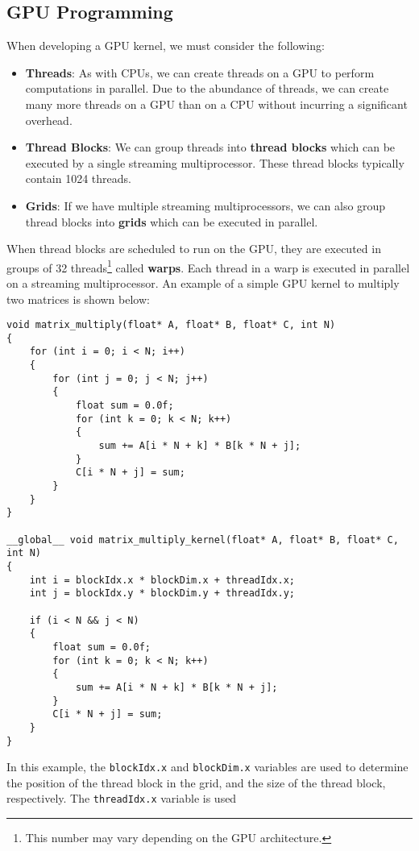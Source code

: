 \documentclass{article}
\begin{document}
\subsection{GPU Programming}
When developing a GPU kernel, we must consider the following:
\begin{itemize}
    \item \textbf{Threads}: As with CPUs, we can create threads on a GPU
          to perform computations in parallel. Due to the abundance of
          threads, we can create many more threads on a GPU than on a CPU
          without incurring a significant overhead.
    \item \textbf{Thread Blocks}: We can group threads into \textbf{thread
              blocks} which can be executed by a single streaming multiprocessor.
          These thread blocks typically contain 1024 threads.
    \item \textbf{Grids}: If we have multiple streaming multiprocessors, we
          can also group thread blocks into \textbf{grids} which can be
          executed in parallel.
\end{itemize}
When thread blocks are scheduled to run on the GPU, they are executed in
groups of 32 threads\footnote{
    This number may vary depending on the GPU architecture.
} called \textbf{warps}. Each thread in a warp is executed in parallel
on a streaming multiprocessor. An example of a simple GPU kernel to
multiply two matrices is shown below:
\begin{verbatim}
void matrix_multiply(float* A, float* B, float* C, int N)
{
    for (int i = 0; i < N; i++)
    {
        for (int j = 0; j < N; j++)
        {
            float sum = 0.0f;
            for (int k = 0; k < N; k++)
            {
                sum += A[i * N + k] * B[k * N + j];
            }
            C[i * N + j] = sum;
        }
    }
}

__global__ void matrix_multiply_kernel(float* A, float* B, float* C, int N)
{
    int i = blockIdx.x * blockDim.x + threadIdx.x;
    int j = blockIdx.y * blockDim.y + threadIdx.y;

    if (i < N && j < N)
    {
        float sum = 0.0f;
        for (int k = 0; k < N; k++)
        {
            sum += A[i * N + k] * B[k * N + j];
        }
        C[i * N + j] = sum;
    }
}
\end{verbatim}
In this example, the \texttt{blockIdx.x} and
\texttt{blockDim.x} variables are used to determine the
position of the thread block in the grid, and the size of the thread
block, respectively. The \texttt{threadIdx.x} variable is used
\end{document}
